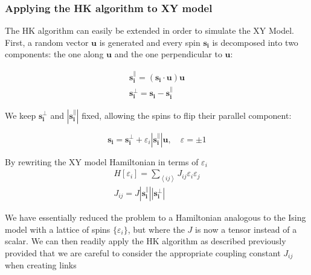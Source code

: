 \documentclass[twoside]{article}
\def\mean#1{\left< #1 \right>}
\begin{document}
\begin{multicols}{2}
\subsubsection{Applying the HK algorithm to XY model}
The HK algorithm can easily be extended in order to simulate the XY Model. First, a random vector $\mathbf{u}$ is generated and every spin $\mathbf{s_i}$ is decomposed into two components: the one along $\mathbf{u}$ and the one perpendicular to $\mathbf{u}$:

\begin{align}
\mathbf{s_i^{\parallel}} = (\mathbf{s_i} \cdot \mathbf{u}) \mathbf{u} \\
\mathbf{s_i^{\bot}} = \mathbf{s_i} - \mathbf{s_i^{\parallel}}
\end{align}

We keep $\mathbf{s_i^{\bot}}$ and $|\mathbf{s_i^{\parallel}}|$ fixed, allowing the spins to flip their parallel component:

\begin{equation}
\mathbf{s_i} = \mathbf{s_i^{\bot}} + \varepsilon_i |\mathbf{s_i^{\parallel}}| \mathbf{u}, \quad \varepsilon = \pm 1
\end{equation}

By rewriting the XY model Hamiltonian in terms of $\varepsilon_i$ 
\begin{align}
H[\varepsilon_i] = \sum_{\mean{ij}} J_{ij} \varepsilon_i \varepsilon_j \\
J_{ij} = J |\mathbf{s_i^{\parallel}}||\mathbf{s_i^{\bot}}|
\end{align}

We have essentially reduced the problem to a Hamiltonian analogous to the Ising model with a lattice of spins $\{\varepsilon_i\}$, but where the $J$ is now a tensor instead of a scalar. We can then readily apply the HK algorithm as described previously provided that we are careful to consider the appropriate coupling constant $J_{ij}$ when creating links


\end{multicols}
\end{document}
